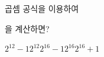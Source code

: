 곱셈 공식을 이용하여 \par\smallskip{}\par\smallskip\noindent 을 계산하면?
\begin{choices32}{$2^{12}-1$}{$2^{12}$}{$2^{16}-1$}{$2^{16}$}{$2^{16}+1$}\end{choices32}

